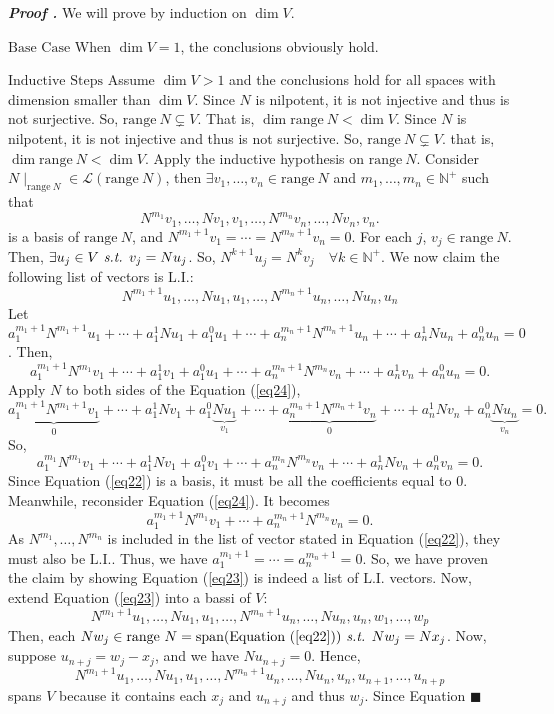 \documentclass[11pt, letterpaper]{article}
\newcounter{nprf}[subsection]
\newenvironment*{prf}{\par\indent\textbf{\textit{Proof \stepcounter{nprf}\thenprf.}}}{\hfill$\blacksquare$\par}
\def\N{\mathbb{N}}
\def\L{\mathcal{L}}
\def\st{\emph{ s.t. }}
\def\LI{\mathrm{L.I.}}
\def\span{\mathrm{span}}
\def\range{\mathrm{range\ }}
\begin{document}
\begin{prf}
	We will prove by induction on $\dim V$.\par 
	$\boxed{\text{Base Case}}$ When $\dim V=1$, the conclusions obviously hold. \par 
	$\boxed{\text{Inductive Steps}}$ Assume $\dim V>1$ and the conclusions hold for all spaces with dimension smaller than $\dim V$. Since $N$ is nilpotent, it is not injective and thus is not surjective. So, $\range N\subsetneq V$. That is, $\dim\range N<\dim V$. Since $N$ is nilpotent, it is not injective and thus is not surjective. So, $\range N\subsetneq V$. that is, $\dim\range N<\dim V$. Apply the inductive hypothesis on $\range N$. Consider $N\mid_{\range N}\in\L(\range N)$, then $\exists v_1,\dots,v_n\in\range N$ and $m_1,\dots,m_n\in\N^+$ such that \begin{equation}\label{eq22} N^{m_1}v_1,\dots, Nv_1,v_1,\dots,N^{m_n}v_n,\dots,Nv_n,v_n.\end{equation} is a basis of $\range N$, and $N^{m_1+1}v_1=\cdots=N^{m_n+1}v_n=0$. For each $j$, $v_j\in\range N$. Then, $\exists u_j\in V\st v_j=Nu_j$. So, $N^{k+1}u_j=N^{k}v_j\quad\forall k\in\N^+$. We now claim the following list of vectors is $\LI$: \begin{equation}\label{eq23}N^{m_1+1}u_1,\dots,Nu_1,u_1,\dots,N^{m_n+1}u_n,\dots,Nu_n,u_n\end{equation} Let $a_1^{m_1+1}N^{m_1+1}u_1+\cdots+a_1^1Nu_1+a_1^0u_1+\cdots+a_n^{m_n+1}N^{m_n+1}u_n+\cdots+a_n^1Nu_n+a_n^0u_n=0$. Then, \begin{equation}\label{eq24}a_1^{m_1+1}N^{m_1}v_1+\cdots+a_1^1v_1+a_1^0u_1+\cdots+a_n^{m_n+1}N^{m_n}v_n+\cdots+a_n^1v_n+a_n^0u_n=0.\end{equation} Apply $N$ to both sides of the Equation (\ref{eq24}), \[\underbrace{a_1^{m_1+1}N^{m_1+1}v_1}_{0}+\cdots+a_1^1Nv_1+a_1^0\underbrace{Nu_1}_{v_1}+\cdots+\underbrace{a_n^{m_n+1}N^{m_n+1}v_n}_{0}+\cdots+a_n^1Nv_n+a_n^0\underbrace{Nu_n}_{v_n}=0.\] So, \[a_1^{m_1}N^{m_1}v_1+\cdots+a_1^1Nv_1+a_1^0v_1+\cdots+a_n^{m_n}N^{m_n}v_n+\cdots+a_n^1Nv_n+a_n^0v_n=0.\] Since Equation (\ref{eq22}) is a basis, it must be all the coefficients equal to $0$. Meanwhile, reconsider Equation (\ref{eq24}). It becomes \[a_1^{m_1+1}N^{m_1}v_1+\cdots+a_n^{m_n+1}N^{m_n}v_n=0.\] As $N^{m_1},\dots,N^{m_n}$ is included in the list of vector stated in Equation (\ref{eq22}), they must also be $\LI$. Thus, we have $a_1^{m_1+1}=\cdots=a_n^{m_n+1}=0$. So, we have proven the claim by showing Equation (\ref{eq23}) is indeed a list of $\LI$ vectors. Now, extend Equation (\ref{eq23}) into a bassi of $V$: \begin{equation}\label{eq25}N^{m_1+1}u_1,\dots,Nu_1,u_1,\dots,N^{m_n+1}u_n,\dots,Nu_n,u_n,w_1,\dots,w_p\end{equation} Then, each $Nw_j\in\range N=\span(\text{Equation (\ref{eq22})})\st Nw_j=Nx_j$. Now, suppose $u_{n+j}=w_j-x_j$, and we have $Nu_{n+j}=0$. Hence, \begin{equation}\label{eq26}N^{m_1+1}u_1,\dots,Nu_1,u_1,\dots,N^{m_n+1}u_n,\dots,Nu_n,u_n,u_{n+1},\dots,u_{n+p}\end{equation} spans $V$ because it contains each $x_j$ and $u_{n+j}$ and thus $w_j$. Since Equation 
\end{prf}
\end{document}

